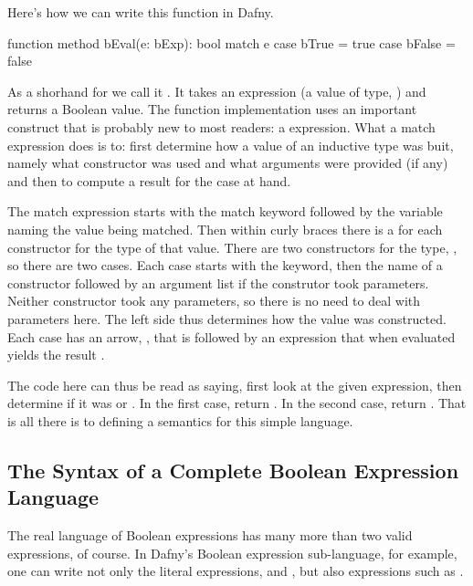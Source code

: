 \documentclass[letterpaper,10pt,english]{sphinxmanual}
\begin{document}
Here’s how we can write this function in Dafny.

\begin{sphinxVerbatim}[commandchars=\\\{\}]
function method bEval(e: bExp): bool
\PYGZob{}
  match e
  \PYGZob{}
      case bTrue =\PYGZgt{} true
      case bFalse =\PYGZgt{} false
  \PYGZcb{}
\PYGZcb{}
\end{sphinxVerbatim}

As a shorhand for  we call it . It
takes an expression (a value of type, ) and returns a Boolean
value.  The function implementation uses an important construct that
is probably new to most readers: a  expression. What a match
expression does is to: first determine how a value of an inductive
type was buit, namely what constructor was used and what arguments
were provided (if any) and then to compute a result for the case at
hand.

The match expression starts with the match keyword followed by the
variable naming the value being matched. Then within curly braces
there is a  for each constructor for the type of that value.
There are two constructors for the type, , so there are two
cases. Each case starts with the  keyword, then the name of a
constructor followed by an argument list if the construtor took
parameters. Neither constructor took any parameters, so there is no
need to deal with parameters here. The left side thus determines how
the value was constructed. Each case has an arrow, \sphinxstyleemphasis{=\textgreater{}}, that is
followed by an expression that when evaluated yields the result .

The code here can thus be read as saying, first look at the given
expression, then determine if it was  or . In the first
case, return . In the second case, return . That is all
there is to defining a semantics for this simple language.


\subsection{The Syntax of a Complete Boolean Expression Language}
\label{\detokenize{08-boolean-algebra:the-syntax-of-a-complete-boolean-expression-language}}
The real language of Boolean expressions has many more than two valid
expressions, of course. In Dafny’s Boolean expression sub-language,
for example, one can write not only the literal expressions, 
and , but also expressions such as .
\end{document}
